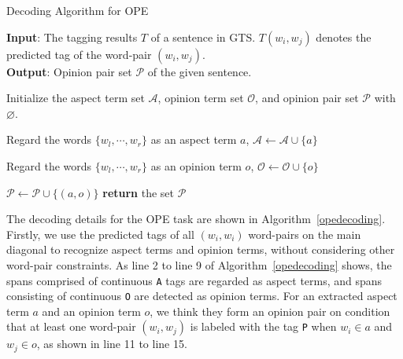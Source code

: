 \documentclass[11pt,a4paper]{article}
\begin{document}
\begin{algorithm}[t]
	\small
	\caption{Decoding Algorithm for OPE}
	\label{alg:algorithm}
	\textbf{Input}: The tagging results $T$ of a sentence in GTS. $T(w_i, w_j)$ denotes the predicted tag of the word-pair $(w_i, w_j)$.\\
	\textbf{Output}: Opinion pair set $\mathcal{P}$ of the given sentence.
	\begin{algorithmic}[1] \STATE Initialize the aspect term set $\mathcal{A}$, opinion term set $\mathcal{O}$, and opinion pair set $\mathcal{P}$ with $\varnothing$.
		
		\STATE Regard the words $\{w_l,\cdots, w_r\}$ as an aspect term $a$, $\mathcal{A}\leftarrow \mathcal{A}  \cup  \{a\}$
		
		\ENDIF
		\STATE Regard the words $\{w_l,\cdots, w_r\}$ as an opinion term $o$, $\mathcal{O}\leftarrow \mathcal{O}  \cup  \{o\}$
		\ENDIF
		
		\ENDWHILE
		
		
		\STATE $\mathcal{P}\leftarrow \mathcal{P}  \cup  \{(a, o)\}$
		\ENDIF
		\ENDWHILE
		\ENDWHILE		
		\STATE \textbf{return} the set $\mathcal{P}$
	\end{algorithmic}
	\label{opedecoding}
\end{algorithm}




The decoding details for the OPE task are shown in Algorithm~\ref{opedecoding}. Firstly, we use the predicted tags of all $(w_i, w_i)$ word-pairs on the main diagonal to recognize aspect terms and opinion terms, without considering other word-pair constraints. As line 2 to line 9 of Algorithm~\ref{opedecoding} shows, the spans comprised of continuous \texttt{A} tags are regarded as aspect terms, and spans consisting of continuous \texttt{O} are detected as opinion terms. For an extracted aspect term $a$ and an opinion term $o$, we think they form an opinion pair on condition that at least one word-pair $(w_i, w_j)$ is labeled with the tag \texttt{P} when $w_i\in a$ and $w_j \in o$, as shown in line 11 to line 15.
\end{document}
